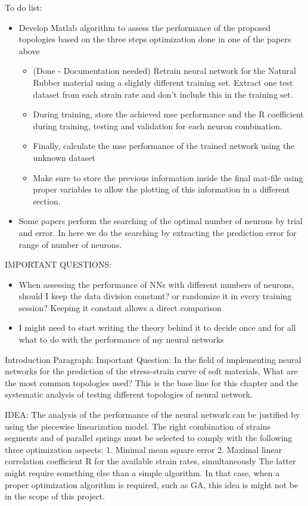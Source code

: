 {\Huge To do list: }
\begin{itemize}
    \item Develop Matlab algorithm to assess the performance of the proposed topologies based on the three steps optimization done in one of the papers above
    \begin{itemize}
        \item (Done - Documentation needed) Retrain neural network for the Natural Rubber material using a slightly different training set. Extract one test dataset from each strain rate and don't include this in the training set.
    \item During training, store the achieved mse performance and the R coefficient during training, testing and validation for each neuron combination.
    \item Finally, calculate the mse performance of the trained network using the unknown dataset
    \item Make sure to store the previous information inside the final mat-file using proper variables to allow the plotting of this information in a different section.
    \end{itemize}
    \item Some papers perform the searching of the optimal number of neurons by trial and error. In here we do the searching by extracting the prediction error for  range of number of neurons.
\end{itemize}

{\Huge IMPORTANT QUESTIONS:}
\begin{itemize}
    \item When assessing the performance of NNs with different numbers of neurons, should I keep the data division constant? or randomize it in every training session? Keeping it constant allows a direct comparison
    \item I might need to start writing the theory behind it to decide once and for all what to do with the performance of my neural networks
\end{itemize}

Introduction Paragraph: Important Question: In the field of implementing neural networks for the prediction of the stress-strain curve of soft materials, What are the most common topologies used? This is the base line for this chapter and the systematic analysis of testing different topologies of neural network.

IDEA: The analysis of the performance of the neural network can be justified by using the piecewise linearization model. The right combination of strains segments and of parallel springs must be selected to comply with the following three optimization aspects: 1. Minimal mean square error 
2. Maximal linear correlation coefficient R for the available strain rates, simultaneously
The latter might require something else than a simple algorithm. In that case, when a proper optimization algorithm is required, such as GA, this idea is might not be in the scope of this project.


